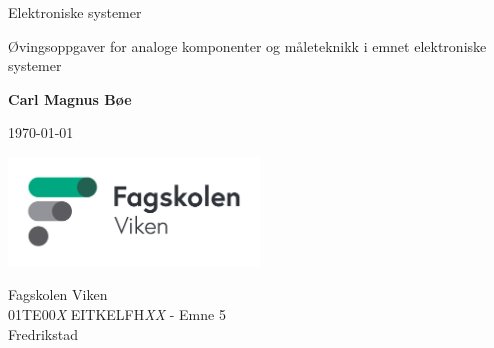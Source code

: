 \begin{titlepage}
    \begin{center}
    \vspace*{1cm}

    \Huge
	Elektroniske systemer

    \Large
    \vspace{0.5cm}
    Øvingsoppgaver for analoge komponenter og måleteknikk i emnet elektroniske systemer


   \vspace{1.5cm}
   \textbf{Carl Magnus Bøe}

    \today{}
	\vfill




    \includegraphics[width=0.5\textwidth]{frontmatter/bilder/r171JViZ6gmf8WXujFQw.jpg}

    \Large
    Fagskolen Viken\\
    01TE00\textit{X} EITKELFH\textit{XX} - Emne 5\\
    Fredrikstad\\

    \end{center}
\end{titlepage}